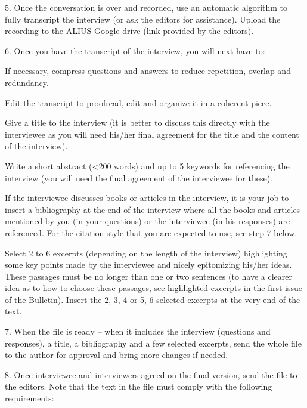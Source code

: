\documentclass[11pt]{article}
\begin{document}
5. Once the conversation is over and recorded, use an automatic algorithm to fully transcript the interview (or ask the editors for assistance). Upload the recording to the ALIUS Google drive (link provided by the editors).\par

6. Once you have the transcript of the interview, you will next have to:\par

If necessary, compress questions and answers to reduce repetition, overlap and redundancy.\par

Edit the transcript to proofread, edit and organize it in a coherent piece.\par

Give a title to the interview (it is better to discuss this directly with the interviewee as you will need his/her final agreement for the title and the content of the interview).\par

Write a short abstract (<200 words) and up to 5 keywords for referencing the interview (you will need the final agreement of the interviewee for these).\par

If the interviewee discusses books or articles in the interview, it is your job to insert a bibliography at the end of the interview where all the books and articles mentioned by you (in your questions) or the interviewee (in his responses) are referenced. For the citation style that you are expected to use, see step 7 below.\par

Select 2 to 6 excerpts (depending on the length of the interview) highlighting some key points made by the interviewee and nicely epitomizing his/her ideas. These passages must be no longer than one or two sentences (to have a clearer idea as to how to choose these passages, see highlighted excerpts in the first issue of the Bulletin). Insert the 2, 3, 4 or 5, 6 selected excerpts at the very end of the text.\par

7. When the file is ready – when it includes the interview (questions and responses), a title, a bibliography and a few selected excerpts, send the whole file to the author for approval and bring more changes if needed.\par

8. Once interviewee and interviewers agreed on the final version, send the file to the editors. Note that the text in the file must comply with the following requirements:\par
\end{document}
